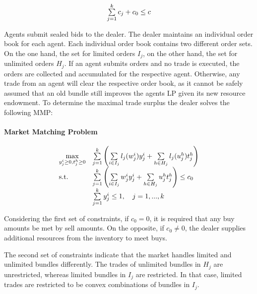 \begin{equation*}
 \begin{array}{ll@{}ll}
 \sum\limits_{j=1}^{k} c_{j} + c_{0} \leq c
 \end{array}
\end{equation*}

Agents submit sealed bids to the dealer. The dealer maintains an individual order book for each agent. 
Each individual order book contains two different order sets. On the one hand, the set for limited orders $I_{j}$,
on the other hand, the set for unlimited orders $H_{j}$.
If an agent submits orders and no trade is executed, the orders are collected and 
accumulated for the respective agent. Otherwise, any trade from an agent will clear the respective order book,
as it cannot be safely assumed that an old bundle still improves the agents LP given its new resource endowment.
To determine the maximal trade surplus the dealer solves the following MMP:

\paragraph*{Market Matching Problem}

\begin{equation}
\label{eq:mmp}
 \begin{array}{ll@{}ll}
 \underset{y_{j}^{i} \geq 0, t_{j}^{h} \geq 0 }{\text{max}} & 
 \sum\limits_{j=1}^{k}
 \left(\sum\limits_{i \in I_{j}}^{} l_{j}(w_{j}^{i})y_{j}^{i} + 
 \sum\limits_{h \in H_{j}}^{} l_{j}(u_{j}^{h})t_{j}^{h} \right) &\\
 \text{s.t.}
 & \sum\limits_{j=1}^{k}
 \left(\sum\limits_{i \in I_{j}}^{} w_{j}^{i}y_{j}^{i} + 
 \sum\limits_{h \in H_{j}}^{} u_{j}^{h}t_{j}^{h} \right) \leq c_{0} \\
 & \sum\limits_{j=1}^{k} y_{j}^{i} \leq 1, \quad j=1 ,..., k
 \end{array}
\end{equation}

Considering the first set of constraints, if $c_{0} = 0$, it is required that any buy amounts be met by sell amounts. 
On the opposite, if $c_{0} \neq 0$, the dealer supplies additional resources from the inventory
to meet buys. 

The second set of constraints indicate that the market handles limited and unlimited bundles differently. 
The trades of unlimited bundles in $H_{j}$ are unrestricted, whereas limited bundles in $I_{j}$
are restricted. In that case, limited trades are restricted to be convex combinations of bundles in $I_{j}$.

